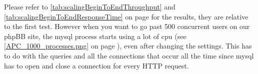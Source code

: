 Please refer to  \autoref{tab:scalingBeginToEndThroughput} and \autoref{tab:scalingBeginToEndResponseTime} on page \pageref{tab:scalingBeginToEndResponseTime} for the results, they are relative to the first test. 
However when you want to go past 500 concurrent users on our phpBB site, the \gls{mysql} process starts using a lot of \gls{cpu} (see \autoref{APC_1000_processes.png} on page \pageref{APC_1000_processes.png}), even after changing the settings. 
This has to do with the queries and all the connections that occur all the time since \gls{mysql} has to open and close a connection for every HTTP request.

\begin{comment}
	\begin{table}[htb!]\begin{center}
\caption{Percentage scaling from begin to end tests}\label{tab:scalingBeginToEnd}
\arrayrulecolor{myLightGreen}
\begin{tabular}{|p{1cm}|p{1cm}|p{1cm}|p{1cm}|p{1cm}|p{1cm}|p{1cm}|p{1cm}|p{1cm}|p{1cm}|p{1cm}|}\hline\rowcolor{myLightGreen}
  & \multicolumn{2}{>{\columncolor{myLightGreen}}c|}{\bf\color{white} Normal test} & \multicolumn{2}{>{\columncolor{myLightGreen}}c|}{\bf\color{white} Memcached} & \multicolumn{2}{>{\columncolor{myLightGreen}}c|}{\bf\color{white} New settings}  & \multicolumn{2}{>{\columncolor{myLightGreen}}c|}{\bf\color{white} Bad settings}  & \multicolumn{2}{>{\columncolor{myLightGreen}}c|}{\bf\color{white} APC} \\ \hline  \rowcolor{myLightGreen}
 {\bf\color{white} Users} & {\bf\color{white} T /s} & {\bf\color{white} R T ms} & {\bf\color{white} T /s} & {\bf\color{white} R T ms} & {\bf\color{white} T /s} & {\bf\color{white} R T ms} & {\bf\color{white} T /s} & {\bf\color{white} R T ms} & {\bf\color{white} T /s} & {\bf\color{white} R T ms} \\ \hline 
 5 & 45 & 14 & 3\% & 6\% & 4\% & 21\% & -7\% & 32\% & 9\% & -16\% \\ \hline 
 25 & 212 & 27 & -4\% & 2\% & -2\% & -7\% & -1\% & -7\% & 6\% & -41\% \\ \hline 
 50 & 397 & 32 & -2\% & 15\% & -1\% & 8\% & -3\% & 12\% & 5\% & -9\% \\ \hline 
 100 & 702 & 49 & 2\% & -6\% & 1\% & -3\% & 4\% & -11\% & 10\% & -26\% \\ \hline 
 200 & 1290 & 63 & 0\% & 0\% & 3\% & -7\% & 0\% & 0\% & 9\% & -19\% \\ \hline 
 300 & 1548 & 115 & 7\% & -21\% & 11\% & -28\% & -2\% & 2\% & 20\% & -39\% \\ \hline 
 325 & 1581 & 128 & 3\% & -14\% & 10\% & -25\% & 2\% & -5\% & 25\% & -42\% \\ \hline 
 350 & 1620 & 139 & 4\% & -13\% & 1\% & -10\% & -11\% & 17\% & 24\% & -39\% \\ \hline 
 375 & 1753 & 127 & -1\% & 2\% & 0\% & -1\% & -9\% & 32\% & 5\% & -9\% \\ \hline 
 400 & 1694 & 149 & -3\% & 9\% & -1\% & 2\% & -11\% & 24\% & \textbf{26\%} & \textbf{-28\%} \\ \hline 
\end{tabular}\end{center}
\end{table}


\end{comment}
